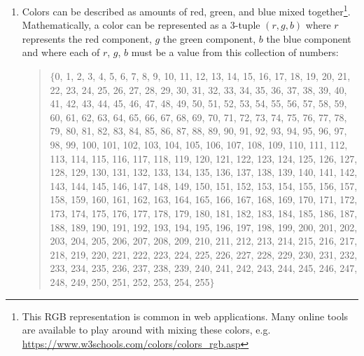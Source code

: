 \documentclass[12pt, oneside]{article}
\begin{document}
\begin{enumerate}
\item Colors can be described as amounts of red, green, and blue mixed together\footnote{This RGB representation
is common in web applications.  Many online tools are available to play around with mixing these colors, e.g. \url{https://www.w3schools.com/colors/colors_rgb.asp}}.  Mathematically, a color can be represented as a $3$-tuple $(r, g, b)$ where $r$
represents the red component, $g$ the green component, $b$ the blue component and where each of $r$, $g$, $b$ must
be a value from this collection of numbers:
\begin{quote}
$\{$0, 1, 2, 3, 4, 5, 6, 7, 8, 9, 10, 11, 12, 13, 14, 15, 16, 17, 18, 19, 20, 21, 22, 23, 24, 25, 26, 27, 28, 29, 30, 31, 32, 33, 34, 35, 36, 37, 38, 39, 40, 41, 42, 43, 44, 45, 46, 47, 48, 49, 50, 51, 52, 53, 54, 55, 56, 57, 58, 59, 60, 61, 62, 63, 64, 65, 66, 67, 68, 69, 70, 71, 72, 73, 74, 75, 76, 77, 78, 79, 80, 81, 82, 83, 84, 85, 86, 87, 88, 89, 90, 91, 92, 93, 94, 95, 96, 97, 98, 99, 100, 101, 102, 103, 104, 105, 106, 107, 108, 109, 110, 111, 112, 113, 114, 115, 116, 117, 118, 119, 120, 121, 122, 123, 124, 125, 126, 127, 128, 129, 130, 131, 132, 133, 134, 135, 136, 137, 138, 139, 140, 141, 142, 143, 144, 145, 146, 147, 148, 149, 150, 151, 152, 153, 154, 155, 156, 157, 158, 159, 160, 161, 162, 163, 164, 165, 166, 167, 168, 169, 170, 171, 172, 173, 174, 175, 176, 177, 178, 179, 180, 181, 182, 183, 184, 185, 186, 187, 188, 189, 190, 191, 192, 193, 194, 195, 196, 197, 198, 199, 200, 201, 202, 203, 204, 205, 206, 207, 208, 209, 210, 211, 212, 213, 214, 215, 216, 217, 218, 219, 220, 221, 222, 223, 224, 225, 226, 227, 228, 229, 230, 231, 232, 233, 234, 235, 236, 237, 238, 239, 240, 241, 242, 243, 244, 245, 246, 247, 248, 249, 250, 251, 252, 253, 254, 255$\}$
\end{quote}


\end{enumerate}
\end{document}
